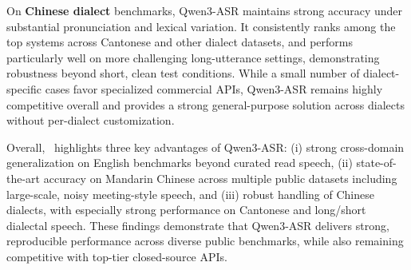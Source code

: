 On \textbf{Chinese dialect} benchmarks, Qwen3-ASR maintains strong accuracy under substantial pronunciation and lexical variation. It consistently ranks among the top systems across Cantonese and other dialect datasets, and performs particularly well on more challenging long-utterance settings, demonstrating robustness beyond short, clean test conditions. While a small number of dialect-specific cases favor specialized commercial APIs, Qwen3-ASR remains highly competitive overall and provides a strong general-purpose solution across dialects without per-dialect customization.

Overall,~ highlights three key advantages of Qwen3-ASR: (i) strong cross-domain generalization on English benchmarks beyond curated read speech, (ii) state-of-the-art accuracy on Mandarin Chinese across multiple public datasets including large-scale, noisy meeting-style speech, and (iii) robust handling of Chinese dialects, with especially strong performance on Cantonese and long/short dialectal speech. These findings demonstrate that Qwen3-ASR delivers strong, reproducible performance across diverse public benchmarks, while also remaining competitive with top-tier closed-source APIs.

